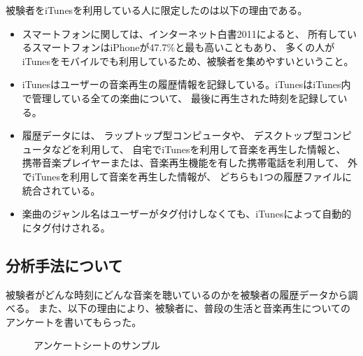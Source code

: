 \documentclass[11pt, onecolumn]{jsarticle}
\begin{document}
被験者をiTunesを利用している人に限定したのは以下の理由である。
\begin{itemize}
\item
スマートフォンに関しては、インターネット白書2011によると、
所有しているスマートフォンはiPhoneが47.7\%と最も高いこともあり、
多くの人がiTunesをモバイルでも利用しているため、被験者を集めやすいということ。
\item
iTunesはユーザーの音楽再生の履歴情報を記録している。iTunesはiTunes内で管理している全ての楽曲について、 最後に再生された時刻を記録している。
\item
履歴データには、
ラップトップ型コンピュータや、
デスクトップ型コンピュータなどを利用して、
自宅でiTunesを利用して音楽を再生した情報と、
携帯音楽プレイヤーまたは、音楽再生機能を有した携帯電話を利用して、
外でiTunesを利用して音楽を再生した情報が、
どちらも1つの履歴ファイルに統合されている。
\item
楽曲のジャンル名はユーザーがタグ付けしなくても、iTunesによって自動的にタグ付けされる。
\end{itemize}

\subsection{分析手法について}
被験者がどんな時刻にどんな音楽を聴いているのかを被験者の履歴データから調べる。
また、以下の理由により、被験者に、普段の生活と音楽再生についてのアンケートを書いてもらった。

\begin{figure}[htbp]
\begin{center}
\caption{アンケートシートのサンプル}
\end{center}
\label{sheet_sample}
\end{figure}
\end{document}
